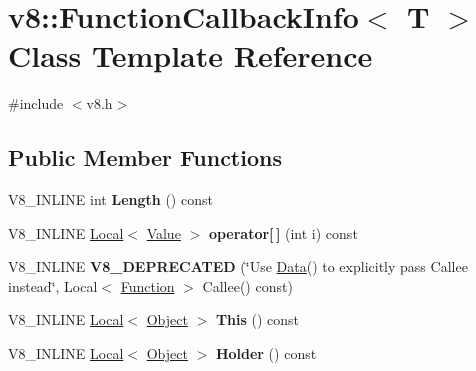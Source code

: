 \hypertarget{classv8_1_1_function_callback_info}{}\section{v8\+:\+:Function\+Callback\+Info$<$ T $>$ Class Template Reference}
\label{classv8_1_1_function_callback_info}


{\ttfamily \#include $<$v8.\+h$>$}

\subsection*{Public Member Functions}
\begin{DoxyCompactItemize}
\item 
V8\+\_\+\+I\+N\+L\+I\+NE int {\bfseries Length} () const \hypertarget{classv8_1_1_function_callback_info_ab27e070d5dca1974adcd1ff9e5482c6e}{}\label{classv8_1_1_function_callback_info_ab27e070d5dca1974adcd1ff9e5482c6e}

\item 
V8\+\_\+\+I\+N\+L\+I\+NE \hyperlink{classv8_1_1_local}{Local}$<$ \hyperlink{classv8_1_1_value}{Value} $>$ {\bfseries operator\mbox{[}$\,$\mbox{]}} (int i) const \hypertarget{classv8_1_1_function_callback_info_a0d911f2ef4a2afcb9a29fbae9e733d9b}{}\label{classv8_1_1_function_callback_info_a0d911f2ef4a2afcb9a29fbae9e733d9b}

\item 
V8\+\_\+\+I\+N\+L\+I\+NE {\bfseries V8\+\_\+\+D\+E\+P\+R\+E\+C\+A\+T\+ED} (\char`\"{}Use \hyperlink{classv8_1_1_data}{Data}() to explicitly pass Callee instead\char`\"{}, Local$<$ \hyperlink{classv8_1_1_function}{Function} $>$ Callee() const)\hypertarget{classv8_1_1_function_callback_info_ab7f9c2a3b7c47d99df6c0f700ae7c1db}{}\label{classv8_1_1_function_callback_info_ab7f9c2a3b7c47d99df6c0f700ae7c1db}

\item 
V8\+\_\+\+I\+N\+L\+I\+NE \hyperlink{classv8_1_1_local}{Local}$<$ \hyperlink{classv8_1_1_object}{Object} $>$ {\bfseries This} () const \hypertarget{classv8_1_1_function_callback_info_a14c7f2df117ad879df898f8451a3fa38}{}\label{classv8_1_1_function_callback_info_a14c7f2df117ad879df898f8451a3fa38}

\item 
V8\+\_\+\+I\+N\+L\+I\+NE \hyperlink{classv8_1_1_local}{Local}$<$ \hyperlink{classv8_1_1_object}{Object} $>$ {\bfseries Holder} () const \hypertarget{classv8_1_1_function_callback_info_a5b080ddb61501773dfd32058b26a5238}{}\label{classv8_1_1_function_callback_info_a5b080ddb61501773dfd32058b26a5238}


\end{DoxyCompactItemize}
